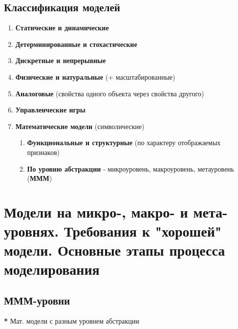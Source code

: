 	\subsection{Классификация моделей}
	\begin{enumerate}
		\item \textbf{Статические и динамические}
		\item \textbf{Детерминированные и стохастические}
		\item \textbf{Дискретные и непрерывные}
		\item \textbf{Физические и натуральные} (+ масштабированные)
		\item \textbf{Аналоговые} (свойства одного объекта через свойства другого)
		\item \textbf{Управленческие игры}
		\item \textbf{Математические модели} (символические)
		\begin{enumerate}
			\item \textbf{Функциональные и структурные} (по характеру отображаемых признаков)
			\item \textbf{По уровню абстракции} - микроуровень, макроуровень, метауровень (\textbf{МММ})
		\end{enumerate}
	\end{enumerate}
	
	\newpage
	
	\section{Модели на микро-, макро- и мета- уровнях. Требования к "хорошей" модели. Основные этапы процесса моделирования}
	
	\subsection{МММ-уровни}
	\textbf{*} Мат. модели с разным уровнем абстракции
	
